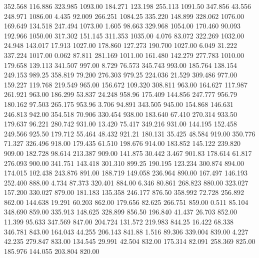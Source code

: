  352.568  116.886  323.985      1093.00
 184.271  123.198  255.113      1091.50
 347.856   43.556  248.971      1086.00
   4.435   92.009  266.251      1084.25
 335.220  148.899  328.062      1076.00
 169.649  134.518  247.494      1073.00
   1.605   98.663  329.968      1054.00
 170.460   90.093  192.966      1050.00
 317.302  151.145  311.353      1035.00
   4.076   83.072  322.269      1032.00
  24.948  143.017   17.913      1027.00
 178.860  127.273  190.700      1027.00
   6.049   31.222  337.224      1017.00
   0.062   87.811  281.169      1011.00
 161.480  142.279  277.783      1010.00
 179.658  139.113  341.507       997.00
   8.729   76.573  345.743       993.00
 185.764  138.154  249.153       989.25
 358.819   79.200  276.303       979.25
 224.036   21.529  309.486       977.00
 159.227  119.768  219.549       965.00
 156.672  109.320  308.811       963.00
 164.627  117.987  261.921       963.00
 186.299   53.837   24.248       958.96
 175.409  144.856  247.777       956.79
 180.162   97.503  265.175       953.96
   3.706   94.891  343.505       945.00
 154.868  146.631  246.813       942.00
 354.518   70.906  330.454       938.00
 183.640   67.410  270.314       933.50
 179.637   96.221  280.742       931.00
  13.420   75.417  349.216       931.00
 144.195  152.458  249.566       925.50
 179.712   55.464   48.432       921.21
 180.131   35.425   48.584       919.00
 350.776   71.327  326.496       918.00
 179.435   61.510  198.676       914.00
 183.852  145.122  239.820       909.00
 182.728   98.614  213.387       909.00
 141.875   30.442    3.467       901.83
 178.614   61.817  276.093       900.00
 341.751  143.418  301.310       899.25
 190.195  123.234  300.874       894.00
 174.015  102.438  243.876       891.00
 188.719  149.058  236.964       890.00
 167.497  146.193  252.400       888.00
   4.734   87.373  320.401       884.00
   6.346   80.861  268.823       880.00
 323.027  157.200  330.027       879.00
 181.183  135.358  246.177       876.50
 358.992   72.728  256.892       862.00
 144.638   19.291   60.203       862.00
 179.656   82.625  266.751       859.00
   0.511   85.104  348.690       859.00
 335.913  148.625  328.899       856.50
 196.840   41.437   26.703       852.00
  11.399   95.633  347.569       847.00
 204.724  131.572  219.983       844.25
  16.422   68.338  346.781       843.00
 164.043   44.255  206.143       841.88
   1.516   89.306  339.004       839.00
   4.227   42.235  279.847       833.00
 134.545   29.991   42.504       832.00
 175.314   82.091  258.369       825.00
 185.976  144.055  203.804       820.00
